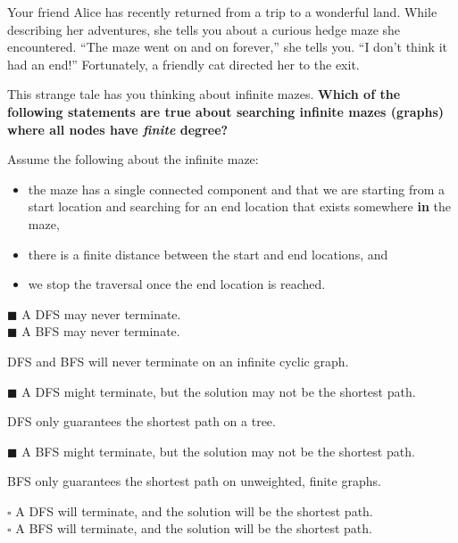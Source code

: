 \documentclass[12pt]{exam}
\newcommand{\stars}[1]{%
    \foreach \n in {1,...,#1}{%
        $\filledstar$%
    }%
}
\begin{document}
\begin{questions}
\begin{parts}
\begin{figure}[H]
        \end{figure}

    \end{parts}

    \clearpage

    \question[10] [W2/3, \stars{2}] Your friend Alice has recently returned from a trip to a wonderful land. While describing her adventures, she tells you about a curious hedge maze she encountered. ``The maze went on and on forever,'' she tells you. ``I don't think it had an end!'' Fortunately, a friendly cat directed her to the exit.

    This strange tale has you thinking about infinite mazes. \textbf{Which of the following statements are true about searching infinite mazes (graphs) where all nodes have \textit{finite} degree?}

    Assume the following about the infinite maze:
    \begin{itemize}
        \item the maze has a single connected component and that we are starting from a start location and searching for an end location that exists somewhere \textbf{in} the maze,
        \item there is a finite distance between the start and end locations, and
        \item we stop the traversal once the end location is reached.
    \end{itemize}

    $\blacksquare$ A DFS may never terminate. \\
    $\blacksquare$ A BFS may never terminate.

    DFS and BFS will never terminate on an infinite cyclic graph.

    $\blacksquare$ A DFS might terminate, but the solution may not be the shortest path.

    DFS only guarantees the shortest path on a tree.

    $\blacksquare$ A BFS might terminate, but the solution may not be the shortest path.

    BFS only guarantees the shortest path on unweighted, finite graphs.

    $\square$ A DFS will terminate, and the solution will be the shortest path. \\
    $\square$ A BFS will terminate, and the solution will be the shortest path.


\end{questions}
\end{document}
